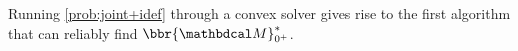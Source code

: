 Running \eqref{prob:joint+idef} through a convex solver gives rise to the 
first algorithm
that can reliably find $\bbr{\dg M}^*_{0^+}$.





